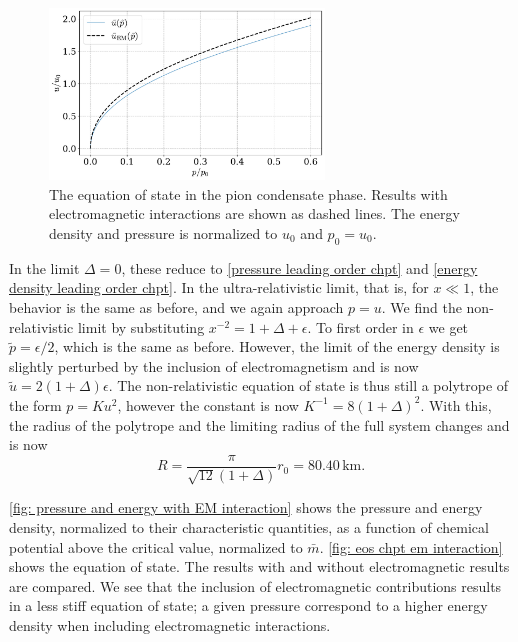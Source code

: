 \begin{figure}[!htb]
    \centering
    \includegraphics[width=0.65\textwidth]{../scripts/figurer/pion_star/pion_eos_EM.pdf}
    \caption{
        The equation of state in the pion condensate phase. 
        Results with electromagnetic interactions are shown as dashed lines.
        The energy density and pressure is normalized to $u_0$ and $p_0 = u_0$.
        }
    \label{fig: eos chpt em interaction}
\end{figure}

In the limit $\Delta = 0$, these reduce to \autoref{pressure leading order chpt} and \autoref{energy density leading order chpt}.
In the ultra-relativistic limit, that is, for  $x \ll 1$, the behavior is the same as before, and we again approach $p = u$.
We find the non-relativistic limit by substituting $x^{-2} = 1 + \Delta + \epsilon$.
To first order in $\epsilon$ we get $\tilde p = \epsilon / 2$, which is the same as before.
However, the limit of the energy density is slightly perturbed by the inclusion of electromagnetism and is now $\tilde u = 2(1 + \Delta) \epsilon$.
The non-relativistic equation of state is thus still a polytrope of the form $p = K u^2$, however the constant is now $K^{-1} = 8 (1+\Delta)^2$.
With this, the radius of the polytrope and the limiting radius of the full system changes and is now
%
\begin{equation}
    \label{maximum mass pion star with em interaction}
    R = \frac{\pi}{\sqrt{12}(1 + \Delta)} r_0 = 80.40 \, \text{km}.
\end{equation}


\autoref{fig: pressure and energy with EM interaction} shows the pressure and energy density, normalized to their characteristic quantities, as a function of chemical potential above the critical value, normalized to $\bar m$.
\autoref{fig: eos chpt em interaction} shows the equation of state.
The results with and without electromagnetic results are compared.
We see that the inclusion of electromagnetic contributions results in a less stiff equation of state; a given pressure correspond to a higher energy density when including electromagnetic interactions.


